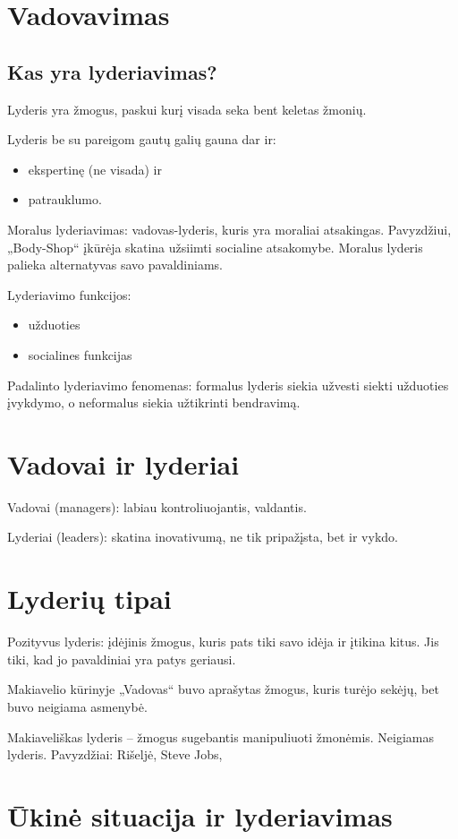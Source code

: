 \chapter{Vadovavimas}

\section{Kas yra lyderiavimas?}

Lyderis yra žmogus, paskui kurį visada seka bent keletas žmonių.

Lyderis be su pareigom gautų galių gauna dar ir:
\begin{itemize}
  \item ekspertinę (ne visada) ir
  \item patrauklumo.
\end{itemize}

Moralus lyderiavimas: vadovas-lyderis, kuris yra moraliai atsakingas.
Pavyzdžiui, „Body-Shop“ įkūrėja skatina užsiimti socialine atsakomybe.
Moralus lyderis palieka alternatyvas savo pavaldiniams.

Lyderiavimo funkcijos:
\begin{itemize}
  \item užduoties
  \item socialines funkcijas
\end{itemize}
Padalinto lyderiavimo fenomenas: formalus lyderis siekia užvesti siekti
užduoties įvykdymo, o neformalus siekia užtikrinti bendravimą.

\chapter{Vadovai ir lyderiai}

Vadovai (managers): labiau kontroliuojantis, valdantis.

Lyderiai (leaders): skatina inovativumą, ne tik pripažįsta, bet ir vykdo.

\chapter{Lyderių tipai}

Pozityvus lyderis: įdėjinis žmogus, kuris pats tiki savo idėja ir įtikina
kitus. Jis tiki, kad jo pavaldiniai yra patys geriausi.

Makiavelio kūrinyje „Vadovas“ buvo aprašytas žmogus, kuris turėjo sekėjų,
bet buvo neigiama asmenybė.

Makiaveliškas lyderis – žmogus sugebantis manipuliuoti žmonėmis.
Neigiamas lyderis. Pavyzdžiai: Rišeljė, Steve Jobs, 

\chapter{Ūkinė situacija ir lyderiavimas}


